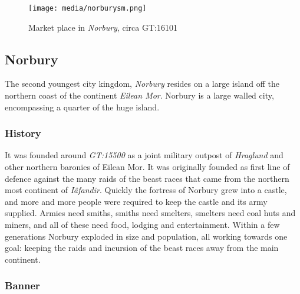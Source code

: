 \begin{figure}[ht!]
  \centering
  \vspace{-2.6cm}
  \centerline{
    \texttt{[image: media/norburysm.png]}
  }
  \par
  Market place in \emph{Norbury}, circa GT:16101
\end{figure}

\subsection{Norbury}
\label{sec:Norbury}


The second youngest city kingdom, \emph{Norbury} resides on a large island off
the northern coast of the continent \emph{Eilean Mor}. Norbury is a large
walled city, encompassing a quarter of the huge island.

\subsubsection*{History}

It was founded around \emph{GT:15500} as a joint military outpost of
\emph{Hraglund} and other northern baronies of Eilean Mor. It was originally
founded as first line of defence against the many raids of the beast races
that came from the northern most continent of \emph{Iâfandir}. Quickly the
fortress of Norbury grew into a castle, and more and more people were
required to keep the castle and its army supplied. Armies need smiths,
smiths need smelters, smelters need coal huts and miners, and all of
these need food, lodging and entertainment. Within a few generations
Norbury exploded in size and population, all working towards one goal:
keeping the raids and incursion of the beast races away from the main
continent.

\subsubsection*{Banner}

